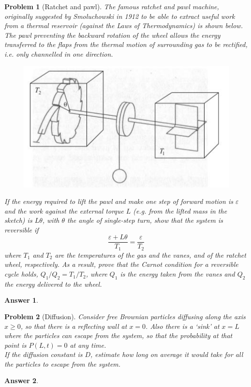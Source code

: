 \documentclass[a4paper]{article}
\newtheorem{ans}{Answer}[section]
\theoremstyle{new}
\newtheorem{qns}{Problem}[section]
\begin{document}
\begin{qns}[Ratchet and pawl]
The famous ratchet and pawl machine, originally suggested by Smoluchowski in 1912 to be able to extract useful work from a thermal reservoir (against the Laws of Thermodynamics) is shown below. The pawl preventing the backward rotation of the wheel allows the energy transferred to the flaps from the thermal motion of surrounding gas to be rectified, i.e. only channelled in one direction.
\begin{figure}[H]
    \centering
    \includegraphics{TSPEx4Q10.JPG}
\end{figure}
If the energy required to lift the pawl and make one step of forward motion is $\varepsilon$ and the work against the external torque $L$ (e.g. from the lifted mass in the sketch) is $L\theta$, with $\theta$ the angle of single-step turn, show that the system is reversible if
$$\frac{\varepsilon+L\theta}{T_1}=\frac{\varepsilon}{T_2}$$
where $T_1$ and $T_2$ are the temperatures of the gas and the vanes, and of the ratchet wheel, respectively. As a result, prove that the Carnot condition for a reversible cycle holds, $Q_1/Q_2=T_1/T_2$, where $Q_1$ is the energy taken from the vanes and $Q_2$ the energy delivered to the wheel. 
\end{qns}
\begin{ans}

\end{ans}
\newpage
\begin{qns}[Diffusion]
Consider free Brownian particles diffusing along the axis $x\geq0$, so that there is a reflecting wall at $x = 0$. Also there is a `sink' at $x = L$ where the particles can escape from the system, so that the probability at that point is $P(L,t) = 0$ at any time.\\[5pt]
If the diffusion constant is $D$, estimate how long on average it would take for all the particles to escape from the system.
\end{qns}
\begin{ans}

\end{ans}
\end{document}
